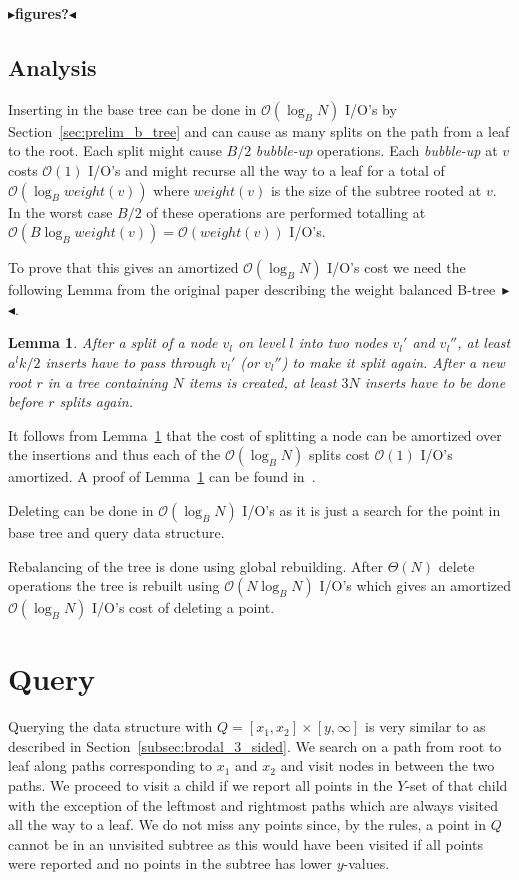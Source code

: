 \documentclass[twoside,11pt,openright]{report}
\newtheorem{lemma}{Lemma}
\newcommand{\todo}[1]{{\color[rgb]{.5,0,0}\textbf{$\blacktriangleright$#1$\blacktriangleleft$}}}
\begin{document}
\todo{figures?}

\subsection{Analysis}
Inserting in the base tree can be done in $\mathcal{O}(\log_B N)$ I/O's by Section~\ref{sec:prelim_b_tree} and can cause as many splits on the path from a leaf to the root. Each split might cause $B/2$ \textit{bubble-up} operations. Each \textit{bubble-up} at $v$ costs $\mathcal{O}(1)$ I/O's and might recurse all the way to a leaf for a total of $\mathcal{O}(\log_B weight(v))$ where $weight(v)$ is the size of the subtree rooted at $v$. In the worst case $B/2$ of these operations are performed totalling at $\mathcal{O}(B\log_B weight(v)) = \mathcal{O}(weight(v))$ I/O's.

To prove that this gives an amortized $\mathcal{O}(\log_B N)$ I/O's cost we need the following Lemma from the original paper describing the weight balanced B-tree~\todo{\cite{weight-balanced}}.
\begin{lemma}
\label{lma:weight_balanced}
After a split of a node $v_l$ on level $l$ into two nodes $v_l'$ and $v_l''$, at least $a^lk/2$ inserts have to pass through $v_l'$ (or $v_l''$) to make it split again. After a new root $r$ in a tree containing $N$ items is created, at least $3N$ inserts have to be done before $r$ splits again.
\end{lemma}

It follows from Lemma~\ref{lma:weight_balanced} that the cost of splitting a node can be amortized over the insertions and thus each of the $\mathcal{O}(\log_B N)$ splits cost $\mathcal{O}(1)$ I/O's amortized.
A proof of Lemma~\ref{lma:weight_balanced} can be found in~\cite{arge_vitter_1996}.

Deleting can be done in $\mathcal{O}(\log_B N)$ I/O's as it is just a search for the point in base tree and query data structure.

Rebalancing of the tree is done using global rebuilding. After $\Theta(N)$ delete operations the tree is rebuilt using $\mathcal{O}(N \log_B N)$ I/O's which gives an amortized $\mathcal{O}(\log_B N)$ I/O's cost of deleting a point.

\section{Query}
\label{sec:arge_query}
Querying the data structure with $Q = \left[ x_1, x_2 \right] \times \left[ y, \infty \right]$ is very similar to as described in Section~\ref{subsec:brodal_3_sided}. We search on a path from root to leaf along paths corresponding to $x_1$ and $x_2$ and visit nodes in between the two paths. We proceed to visit a child if we report all points in the $Y$-set of that child with the exception of the leftmost and rightmost paths which are always visited all the way to a leaf. We do not miss any points since, by the rules, a point in $Q$ cannot be in an unvisited subtree as this would have been visited if all points were reported and no points in the subtree has lower $y$-values.
\end{document}
